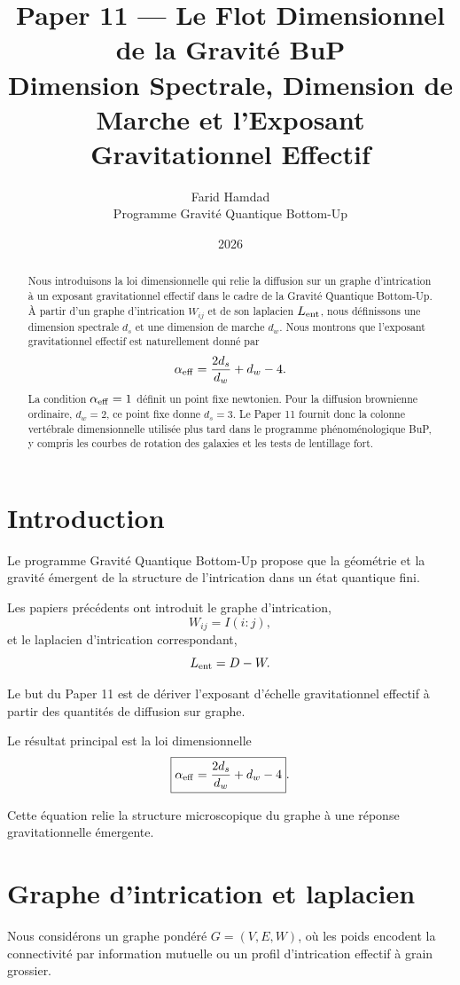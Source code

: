 \documentclass[11pt,a4paper]{article}
\title{
\textbf{Paper 11 — Le Flot Dimensionnel de la Gravité BuP}\\
\large Dimension Spectrale, Dimension de Marche et l'Exposant Gravitationnel Effectif
}
\author{Farid Hamdad\\
Programme Gravité Quantique Bottom-Up}
\date{2026}
\begin{document}
\maketitle

\begin{abstract}
Nous introduisons la loi dimensionnelle qui relie la diffusion sur un graphe d'intrication à un exposant gravitationnel effectif dans le cadre de la Gravité Quantique Bottom-Up. À partir d'un graphe d'intrication \(W_{ij}\) et de son laplacien \(L_{\rm ent}\), nous définissons une dimension spectrale \(d_s\) et une dimension de marche \(d_w\). Nous montrons que l'exposant gravitationnel effectif est naturellement donné par
\[
\alpha_{\rm eff} = \frac{2d_s}{d_w} + d_w - 4.
\]
La condition \(\alpha_{\rm eff} = 1\) définit un point fixe newtonien. Pour la diffusion brownienne ordinaire, \(d_w = 2\), ce point fixe donne \(d_s = 3\). Le Paper 11 fournit donc la colonne vertébrale dimensionnelle utilisée plus tard dans le programme phénoménologique BuP, y compris les courbes de rotation des galaxies et les tests de lentillage fort.
\end{abstract}

\section{Introduction}

Le programme Gravité Quantique Bottom-Up propose que la géométrie et la gravité émergent de la structure de l'intrication dans un état quantique fini.

Les papiers précédents ont introduit le graphe d'intrication,
\[
W_{ij} = I(i : j),
\]
et le laplacien d'intrication correspondant,
\[
L_{\rm ent} = D - W.
\]

Le but du Paper 11 est de dériver l'exposant d'échelle gravitationnel effectif à partir des quantités de diffusion sur graphe.

Le résultat principal est la loi dimensionnelle
\[
\boxed{
\alpha_{\rm eff} = \frac{2d_s}{d_w} + d_w - 4
}.
\]

Cette équation relie la structure microscopique du graphe à une réponse gravitationnelle émergente.

\section{Graphe d'intrication et laplacien}

Nous considérons un graphe pondéré \(G = (V, E, W)\), où les poids encodent la connectivité par information mutuelle ou un profil d'intrication effectif à grain grossier.
\end{document}
